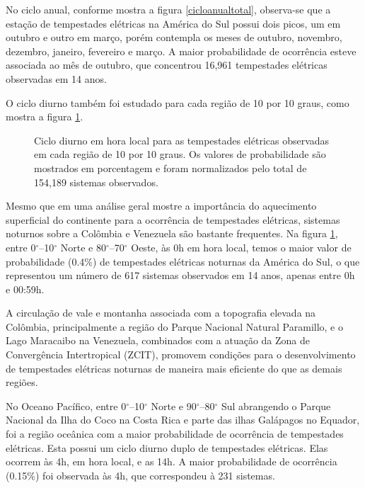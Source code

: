 No ciclo anual, conforme mostra a figura \ref{cicloanualtotal}, observa-se que a estação de tempestades elétricas na América do Sul possui dois picos, um em outubro e outro em março, porém contempla os meses de outubro, novembro, dezembro, janeiro, fevereiro e março. A maior probabilidade de ocorrência esteve associada ao mês de outubro, que concentrou 16,961 tempestades elétricas observadas em 14 anos. %


O ciclo diurno também foi estudado para cada região de 10 por 10 graus, como mostra a figura \ref{diurno}. 



\begin{figure}[!hb]
\caption{Ciclo diurno em hora local para as tempestades elétricas observadas em cada região de 10 por 10 graus. Os valores de probabilidade são mostrados em porcentagem e foram normalizados pelo total de 154,189 sistemas observados.}
\label{diurno}
\end{figure}


Mesmo que em uma análise geral mostre a importância do aquecimento superficial do continente para a ocorrência de tempestades elétricas, sistemas noturnos sobre a Colômbia e Venezuela são bastante frequentes. Na figura \ref{diurno}, entre 0$^{\circ}$--10$^{\circ}$ Norte e 80$^{\circ}$--70$^{\circ}$ Oeste, às 0h em hora local, temos o maior valor de probabilidade (0.4\%) de tempestades elétricas noturnas da América do Sul, o que representou um número de 617 sistemas observados em 14 anos, apenas entre 0h e 00:59h.


A circulação de vale e montanha associada com a topografia elevada na Colômbia, principalmente a região do Parque Nacional Natural Paramillo, e o Lago Maracaibo na Venezuela, combinados com a atuação da Zona de Convergência Intertropical (ZCIT), promovem condições para o desenvolvimento de tempestades elétricas noturnas de maneira mais eficiente do que as demais regiões. 

No Oceano Pacífico, entre 0$^{\circ}$--10$^{\circ}$ Norte e 90$^{\circ}$--80$^{\circ}$ Sul abrangendo o Parque Nacional da Ilha do Coco na Costa Rica e parte das ilhas Galápagos no Equador, foi a região oceânica com a maior probabilidade de ocorrência de tempestades elétricas. Esta possui um ciclo diurno duplo de tempestades elétricas. Elas ocorrem às 4h, em hora local, e as 14h. A maior probabilidade de ocorrência (0.15\%) foi observada às 4h, que correspondeu à 231 sistemas.

